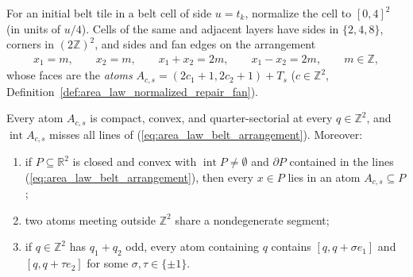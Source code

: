 For an initial belt tile in a belt cell of side $u=t_k$, normalize the cell to $[0,4]^2$
(in units of $u/4$). Cells of the same and adjacent layers have sides in $\{2,4,8\}$,
corners in $(2\mathbb Z)^2$, and sides and fan edges on the arrangement
\begin{align}
    x_1=m,\qquad x_2=m,\qquad x_1+x_2=2m,\qquad x_1-x_2=2m,
    \qquad m\in\mathbb Z,
    \label{eq:area_law_belt_arrangement}
\end{align}
whose faces are the \emph{atoms} $A_{c,s}=(2c_1+1,2c_2+1)+T_s$ ($c\in\mathbb Z^2$,
Definition~\ref{def:area_law_normalized_repair_fan}).

\begin{lemma}
    \label{thm:area_law_belt_atoms}
    \leanok
    Every atom $A_{c,s}$ is compact, convex, and quarter-sectorial at every $q\in\mathbb Z^2$,
    and $\operatorname{int}A_{c,s}$ misses all lines of (\ref{eq:area_law_belt_arrangement}). Moreover:
    \begin{enumerate}
        \item if $P\subseteq\mathbb R^2$ is closed and convex with $\operatorname{int}P\ne\emptyset$
              and $\partial P$ contained in the lines (\ref{eq:area_law_belt_arrangement}), then every
              $x\in P$ lies in an atom $A_{c,s}\subseteq P$;
        \item two atoms meeting outside $\mathbb Z^2$ share a nondegenerate segment;
        \item if $q\in\mathbb Z^2$ has $q_1+q_2$ odd, every atom containing $q$ contains
              $[q,q+\sigma e_1]$ and $[q,q+\tau e_2]$ for some $\sigma,\tau\in\{\pm1\}$.
    \end{enumerate}
\end{lemma}

